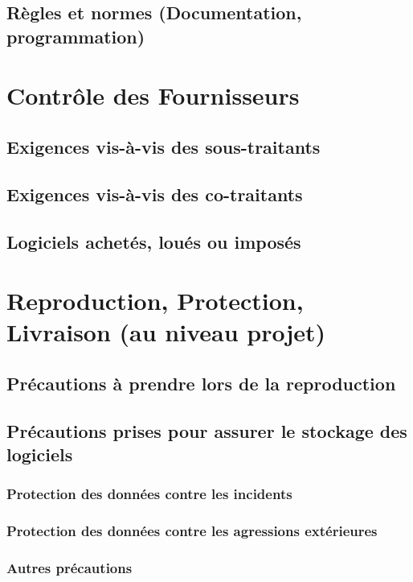 \documentclass[a4paper]{article}
\begin{document}
\subsection{Règles et normes (Documentation, programmation)}

\section{Contrôle des Fournisseurs}

\subsection{Exigences vis-à-vis des sous-traitants}

\subsection{Exigences vis-à-vis des co-traitants}

\subsection{Logiciels achetés, loués ou imposés}

\section{Reproduction, Protection, Livraison (au niveau projet)}

\subsection{Précautions à prendre lors de la reproduction}

\subsection{Précautions prises pour assurer le stockage des logiciels}

\subsubsection{Protection des données contre les incidents}

\subsubsection{Protection des données contre les agressions extérieures}

\subsubsection{Autres précautions}
\end{document}
